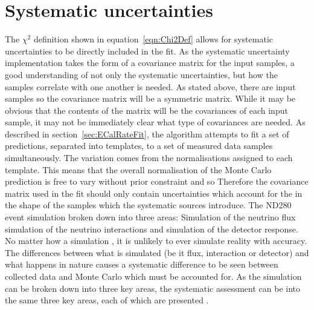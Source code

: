 \section{Systematic uncertainties}
\label{sec:SystematicUncertainties}
The $\chi^2$ definition shown in equation~\ref{eqn:Chi2Def} allows for systematic uncertainties to be directly included in the fit.  As the systematic uncertainty implementation takes the form of a covariance matrix for the input samples, a good understanding of not only the systematic uncertainties, but how the samples correlate with one another is needed.  
\newline
\newline
As stated above, there are  input samples so the covariance matrix will be a  symmetric matrix.  While it may be obvious that the contents of the matrix will be the covariances of each input sample, it may not be immediately clear what type of covariances are needed.  As described in section~\ref{sec:ECalRateFit}, the algorithm attempts to fit a set of predictions, separated into templates, to a set of measured data samples simultaneously.  The variation comes from the normalisations assigned to each template.  This means that the overall normalisation of the Monte Carlo prediction is free to vary without prior constraint and so  Therefore the covariance matrix used in the fit should only contain uncertainties which account for the  in the shape of the samples which the systematic sources introduce.
\newline
\newline
The ND280 event simulation  broken down into three areas: Simulation of the neutrino flux simulation of the neutrino interactions and simulation of the detector response.  No matter how  a simulation , it is unlikely to ever simulate reality with  accuracy.  The differences between what is simulated (be it flux, interaction or detector) and what happens in nature causes a systematic difference to be seen between collected data and Monte Carlo which must be accounted for.  As the simulation can be broken down into three key areas, the systematic assessment can be  into the same three key areas, each of which are presented .  
